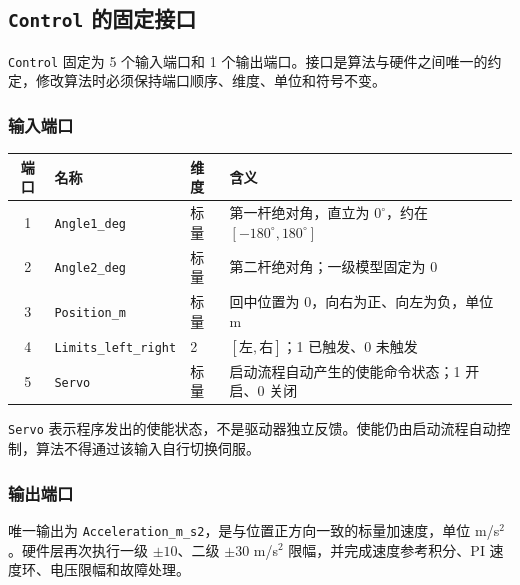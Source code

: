 \documentclass[12pt,a4paper]{article}
\begin{document}
\subsection{\texorpdfstring{\texttt{Control}}{Control} 的固定接口}

\texttt{Control} 固定为 5 个输入端口和 1 个输出端口。接口是算法与硬件之间唯一的约定，修改算法时必须保持端口顺序、维度、单位和符号不变。

\subsubsection{输入端口}

\begin{center}
    \renewcommand{\arraystretch}{1.4}
    \begin{tabular}{@{}c l l p{7.5cm}@{}}
        \toprule
        \textbf{端口} & \textbf{名称} & \textbf{维度} & \textbf{含义} \\
        \midrule
        1 & \texttt{Angle1\_deg} & 标量 & 第一杆绝对角，直立为 $0^\circ$，约在 $[-180^\circ,180^\circ]$ \\
        2 & \texttt{Angle2\_deg} & 标量 & 第二杆绝对角；一级模型固定为 0 \\
        3 & \texttt{Position\_m} & 标量 & 回中位置为 0，向右为正、向左为负，单位 m \\
        4 & \texttt{Limits\_left\_right} & 2 & $[\text{左},\text{右}]$；1 已触发、0 未触发 \\
        5 & \texttt{Servo} & 标量 & 启动流程自动产生的使能命令状态；1 开启、0 关闭 \\
        \bottomrule
    \end{tabular}
\end{center}

\begin{warnbox}
    \texttt{Servo} 表示程序发出的使能状态，不是驱动器独立反馈。使能仍由启动流程自动控制，算法不得通过该输入自行切换伺服。
\end{warnbox}

\subsubsection{输出端口}

唯一输出为 \texttt{Acceleration\_m\_s2}，是与位置正方向一致的标量加速度，单位 m/s$^2$。硬件层再次执行一级 $\pm10$、二级 $\pm30$ m/s$^2$ 限幅，并完成速度参考积分、PI 速度环、电压限幅和故障处理。
\end{document}
